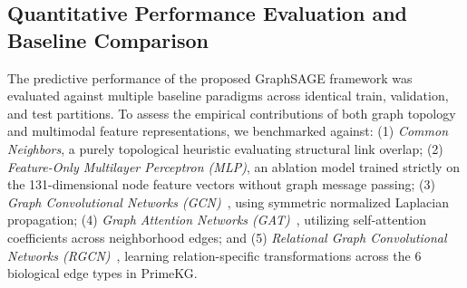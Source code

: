 \documentclass[conference,a4paper]{IEEEtran}
\begin{document}
\subsection{Quantitative Performance Evaluation and Baseline Comparison}
The predictive performance of the proposed GraphSAGE framework was evaluated against multiple baseline paradigms across identical train, validation, and test partitions. To assess the empirical contributions of both graph topology and multimodal feature representations, we benchmarked against: (1) \textit{Common Neighbors}, a purely topological heuristic evaluating structural link overlap; (2) \textit{Feature-Only Multilayer Perceptron (MLP)}, an ablation model trained strictly on the 131-dimensional node feature vectors without graph message passing; (3) \textit{Graph Convolutional Networks (GCN)}~\cite{ref2}, using symmetric normalized Laplacian propagation; (4) \textit{Graph Attention Networks (GAT)}~\cite{ref_gat}, utilizing self-attention coefficients across neighborhood edges; and (5) \textit{Relational Graph Convolutional Networks (RGCN)}~\cite{ref_rgcn}, learning relation-specific transformations across the 6 biological edge types in PrimeKG.
\end{document}
